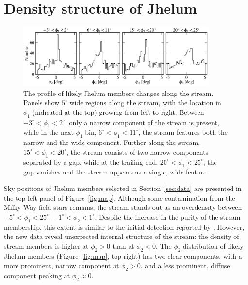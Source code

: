\documentclass[twocolumn]{aastex62}
\begin{document}
\section{Density structure of Jhelum}
\label{sec:structure}

\begin{figure}
\begin{center}
\includegraphics[width=0.9\textwidth]{phi2_histograms.pdf}
\end{center}
\caption{
The profile of likely Jhelum members changes along the stream.
Panels show $5^\circ$ wide regions along the stream, with the location in $\phi_1$ (indicated at the top) growing from left to right.
Between $-3^\circ<\phi_1<2^\circ$, only a narrow component of the stream is present, while in the next $\phi_1$ bin, $6^\circ<\phi_1<11^\circ$, the stream features both the narrow and the wide component.
Further along the stream, $15^\circ<\phi_1<20^\circ$, the stream consists of two narrow components separated by a gap, while at the trailing end, $20^\circ<\phi_1<25^\circ$, the gap vanishes and the stream appears as a single, wide feature.
}
\label{fig:histo}
\end{figure}

Sky positions of Jhelum members selected in Section~\ref{sec:data} are presented in the top left panel of Figure~\ref{fig:map}.
Although some contamination from the Milky Way field stars remains, the stream stands out as an overdensity between $-5^\circ<\phi_1<25^\circ$, $-1^\circ<\phi_2<1^\circ$.
Despite the increase in the purity of the stream membership, this extent is similar to the initial detection reported by \citet{shipp2018}.
However, the new data reveal unexpected internal structure of the stream: the density of stream members is higher at $\phi_2>0$ than at $\phi_2<0$.
The $\phi_2$ distribution of likely Jhelum members (Figure~\ref{fig:map}, top right) has two clear components, with a more prominent, narrow component at $\phi_2>0$, and a less prominent, diffuse component peaking at $\phi_2\approx0$.
\end{document}
